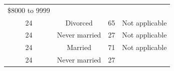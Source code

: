 \documentclass[]{tufte-book}
\begin{document}
\begin{longtable}[]{@{}cccc@{}}
\begin{minipage}[t]{0.21\columnwidth}
\$8000 to 9999\strut
\end{minipage}\tabularnewline
\begin{minipage}[t]{0.14\columnwidth}\centering\strut
24\strut
\end{minipage} & \begin{minipage}[t]{0.20\columnwidth}\centering\strut
Divorced\strut
\end{minipage} & \begin{minipage}[t]{0.07\columnwidth}\centering\strut
65\strut
\end{minipage} & \begin{minipage}[t]{0.21\columnwidth}\centering\strut
Not applicable\strut
\end{minipage}\tabularnewline
\begin{minipage}[t]{0.14\columnwidth}\centering\strut
24\strut
\end{minipage} & \begin{minipage}[t]{0.20\columnwidth}\centering\strut
Never married\strut
\end{minipage} & \begin{minipage}[t]{0.07\columnwidth}\centering\strut
27\strut
\end{minipage} & \begin{minipage}[t]{0.21\columnwidth}\centering\strut
Not applicable\strut
\end{minipage}\tabularnewline
\begin{minipage}[t]{0.14\columnwidth}\centering\strut
24\strut
\end{minipage} & \begin{minipage}[t]{0.20\columnwidth}\centering\strut
Married\strut
\end{minipage} & \begin{minipage}[t]{0.07\columnwidth}\centering\strut
71\strut
\end{minipage} & \begin{minipage}[t]{0.21\columnwidth}\centering\strut
Not applicable\strut
\end{minipage}\tabularnewline
\begin{minipage}[t]{0.14\columnwidth}\centering\strut
24\strut
\end{minipage} & \begin{minipage}[t]{0.20\columnwidth}\centering\strut
Never married\strut
\end{minipage} & \begin{minipage}[t]{0.07\columnwidth}\centering\strut
27\strut
\end{minipage} & \begin{minipage}[t]{0.21\columnwidth}\centering\strut

\end{minipage}
\end{longtable}
\end{document}

